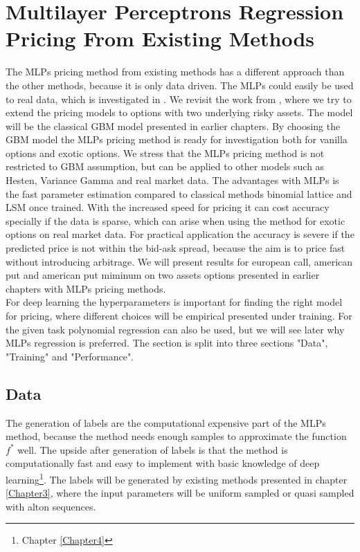 \section{Multilayer Perceptrons Regression Pricing From Existing Methods}
The MLPs pricing method from existing methods has a different approach than the other methods, because it is only data driven. The MLPs could easily be used to real data, which is investigated in \parencite{GasparRaquel20}. We revisit the work from \parencite{HirsaAli2019}, where we try to extend the pricing models to options with two underlying risky assets. The model will be the classical GBM model presented in earlier chapters. By choosing the GBM model the MLPs pricing method is ready for investigation both for vanilla options and exotic options. We stress that the MLPs pricing method is not restricted to GBM assumption, but can be applied to other models such as Hesten, Variance Gamma and real market data. The advantages with MLPs is the fast parameter estimation compared to classical methods binomial lattice and LSM once trained. With the increased speed for pricing it can cost accuracy specially if the data is sparse, which can arise when using the method for exotic options on real market data. For practical application the accuracy is severe if the predicted price is not within the bid-ask spread, because the aim is to price fast without introducing arbitrage. We will present results for european call, american put and american put miminum on two assets options presented in earlier chapters with MLPs pricing methods.\\

For deep learning the hyperparameters is important for finding the right model for pricing, where different choices will be empirical presented under training. For the given task polynomial regression can also be used, but we will see later why MLPs regression is preferred. The section is split into three sections "Data", "Training" and "Performance".

\subsection{Data}
The generation of labels are the computational expensive part of the MLPs method, because the method needs enough samples to approximate the function $f^*$ well. The upside after generation of labels is that the method is computationally fast and easy to implement with basic knowledge of deep learning\footnote{Chapter \ref{Chapter4}}. The labels will be generated by existing methods presented in chapter \ref{Chapter3}, where the input parameters will be uniform sampled or quasi sampled with alton sequences.\\

